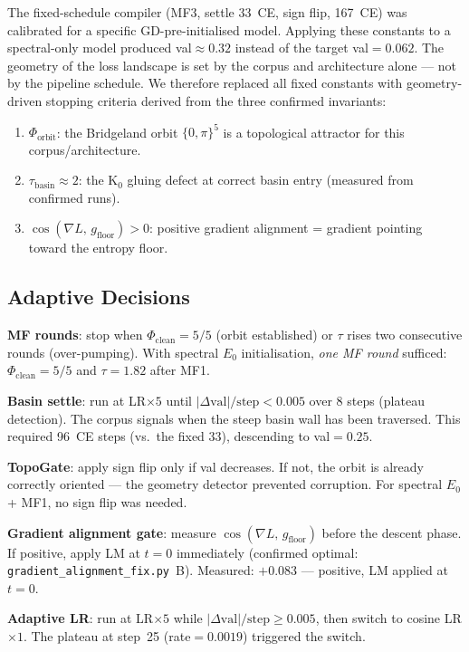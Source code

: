 \documentclass[11pt]{amsart}
\begin{document}
The fixed-schedule compiler (MF3, settle 33~CE, sign flip, 167~CE)
was calibrated for a specific GD-pre-initialised model.
Applying these constants to a spectral-only model produced val$\approx 0.32$
instead of the target val$=0.062$.
The geometry of the loss landscape is set by the corpus and architecture alone
--- not by the pipeline schedule.
We therefore replaced all fixed constants with geometry-driven stopping criteria
derived from the three confirmed invariants:
\begin{enumerate}
\item $\Phi_\mathrm{orbit}$: the Bridgeland orbit $\{0,\pi\}^5$
  is a topological attractor for this corpus/architecture.
\item $\tau_\mathrm{basin} \approx 2$: the K$_0$ gluing defect
  at correct basin entry (measured from confirmed runs).
\item $\cos(\nabla L,\, g_\mathrm{floor}) > 0$:
  positive gradient alignment = gradient pointing toward the entropy floor.
\end{enumerate}

\subsection{Adaptive Decisions}

\textbf{MF rounds}: stop when $\Phi_\mathrm{clean}=5/5$
(orbit established) or $\tau$ rises two consecutive rounds (over-pumping).
With spectral $E_0$ initialisation, \emph{one MF round} sufficed:
$\Phi_\mathrm{clean}=5/5$ and $\tau=1.82$ after MF1.

\textbf{Basin settle}: run at LR$\times 5$ until
$|\Delta\mathrm{val}|/\mathrm{step} < 0.005$ over 8 steps (plateau detection).
The corpus signals when the steep basin wall has been traversed.
This required 96~CE steps (vs.\ the fixed 33), descending to val$=0.25$.

\textbf{TopoGate}: apply sign flip only if val decreases.
If not, the orbit is already correctly oriented ---
the geometry detector prevented corruption.
For spectral $E_0$ + MF1, no sign flip was needed.

\textbf{Gradient alignment gate}: measure
$\cos(\nabla L,\, g_\mathrm{floor})$ before the descent phase.
If positive, apply LM at $t=0$ immediately
(confirmed optimal: \texttt{gradient\_alignment\_fix.py}~B).
Measured: $+0.083$ --- positive, LM applied at $t=0$.

\textbf{Adaptive LR}: run at LR$\times 5$ while
$|\Delta\mathrm{val}|/\mathrm{step} \geq 0.005$,
then switch to cosine LR$\times 1$.
The plateau at step~25 (rate$=0.0019$) triggered the switch.
\end{document}
